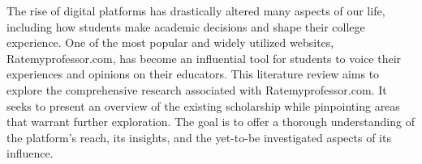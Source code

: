 The rise of digital platforms has drastically altered many aspects of our life, 
including how students make academic decisions and shape their college experience.
One of the most popular and widely utilized websites, Ratemyprofessor.com, has become
an influential tool for students to voice their experiences and opinions on their educators. This literature review aims to explore the comprehensive research associated with Ratemyprofessor.com. 
It seeks to present an overview of the existing scholarship while pinpointing areas that warrant further exploration.
The goal is to offer a thorough understanding of the platform's reach, its insights, and the yet-to-be investigated 
aspects of its influence.